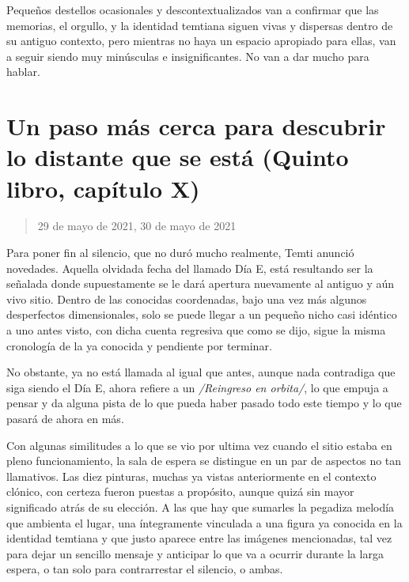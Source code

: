 \documentclass[
  spanish,
]{book}
\begin{document}
Pequeños destellos ocasionales y descontextualizados van a confirmar que las memorias, el orgullo, y la identidad temtiana siguen vivas y dispersas dentro de su antiguo contexto, pero mientras no haya un espacio apropiado para ellas, van a seguir siendo muy minúsculas e insignificantes. No van a dar mucho para hablar.

\hypertarget{un-paso-muxe1s-cerca-para-descubrir-lo-distante-que-se-estuxe1-quinto-libro-capuxedtulo-x}{%
\section{Un paso más cerca para descubrir lo distante que se está (Quinto libro, capítulo X)}\label{un-paso-muxe1s-cerca-para-descubrir-lo-distante-que-se-estuxe1-quinto-libro-capuxedtulo-x}}

\begin{quote}
29 de mayo de 2021, 30 de mayo de 2021
\end{quote}

Para poner fin al silencio, que no duró mucho realmente, Temti anunció novedades. Aquella olvidada fecha del llamado Día E, está resultando ser la señalada donde supuestamente se le dará apertura nuevamente al antiguo y aún vivo sitio. Dentro de las conocidas coordenadas, bajo una vez más algunos desperfectos dimensionales, solo se puede llegar a un pequeño nicho casi idéntico a uno antes visto, con dicha cuenta regresiva que como se dijo, sigue la misma cronología de la ya conocida y pendiente por terminar.

No obstante, ya no está llamada al igual que antes, aunque nada contradiga que siga siendo el Día E, ahora refiere a un \emph{/Reingreso en orbita/}, lo que empuja a pensar y da alguna pista de lo que pueda haber pasado todo este tiempo y lo que pasará de ahora en más.

Con algunas similitudes a lo que se vio por ultima vez cuando el sitio estaba en pleno funcionamiento, la sala de espera se distingue en un par de aspectos no tan llamativos. Las diez pinturas, muchas ya vistas anteriormente en el contexto clónico, con certeza fueron puestas a propósito, aunque quizá sin mayor significado atrás de su elección. A las que hay que sumarles la pegadiza melodía que ambienta el lugar, una íntegramente vinculada a una figura ya conocida en la identidad temtiana y que justo aparece entre las imágenes mencionadas, tal vez para dejar un sencillo mensaje y anticipar lo que va a ocurrir durante la larga espera, o tan solo para contrarrestar el silencio, o ambas.
\end{document}
